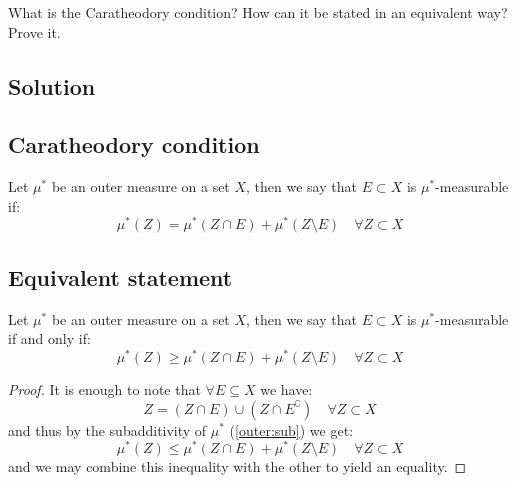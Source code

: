 

\question
What is the Caratheodory condition? How can it be stated in an equivalent way? Prove it.

\subsection*{Solution}

\subsection{Caratheodory condition} \label{CarEq}
Let $\mu^*$ be an outer measure on a set $X$, then we say that $E\subset X$ is $\mu^*$-measurable if:
\[
    \mu^*(Z) = \mu^*(Z\cap E) + \mu^*(Z\setminus E) \quad \forall Z\subset X
\]

\subsection{Equivalent statement}\label{CarIneq}
Let $\mu^*$ be an outer measure on a set $X$, then we say that $E\subset X$ is $\mu^*$-measurable if and only if:
\[
    \mu^*(Z) \geq \mu^*(Z\cap E) + \mu^*(Z\setminus E) \quad \forall Z\subset X
\]
\begin{proof}
    It is enough to note that $\forall E\subseteq X$ we have:
    \[
        Z = (Z\cap E) \cup (Z \cap E^\complement) \quad \forall Z\subset X
    \]
    and thus by the subadditivity of $\mu^*$ (\ref{outer:sub}) we get:
        \[
        \mu^*(Z) \leq \mu^*(Z\cap E) + \mu^*(Z\setminus E) \quad \forall Z\subset X
    \]
    and we may combine this inequality with the other to yield an equality.
\end{proof}
